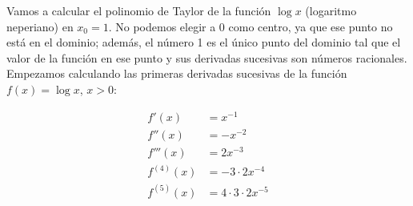 \begin{ejemplo}
Vamos a calcular el polinomio de Taylor de la función $\log x$ (logaritmo neperiano) en $x_0=1$. No podemos elegir a 0 como centro, ya que ese punto no está en el dominio;
además, el número 1 es el único punto del dominio tal que el valor de la función en ese punto y sus derivadas sucesivas son números racionales.
Empezamos calculando las primeras derivadas sucesivas de la función $f(x)= \log x$, $x>0$:

\begin{align*}
f'(x) &= x^{-1} \\
f''(x) &= -x^{-2} \\
f'''(x) &= 2x^{-3} \\
f^{(4)}(x) &= -3\cdot2x^{-4}\\
f^{(5)}(x) &= 4\cdot 3\cdot2x^{-5}
\end{align*}


\end{ejemplo}
